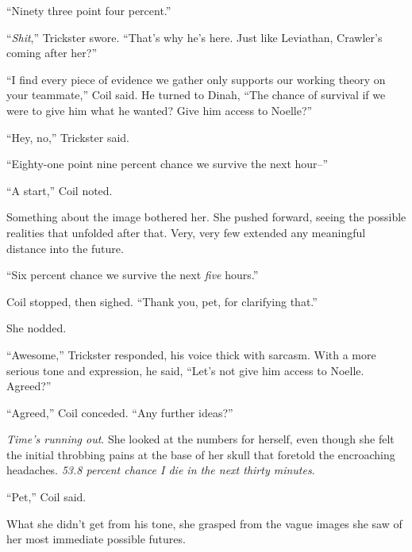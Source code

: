 ``Ninety three point four percent.''



``\emph{Shit},'' Trickster swore.  ``That's why he's here.  Just like Leviathan, Crawler's coming after her?''



``I find every piece of evidence we gather only supports our working theory on your teammate,'' Coil said.  He turned to Dinah, ``The chance of survival if we were to give him what he wanted?  Give him access to Noelle?''



``Hey, no,'' Trickster said.



``Eighty-one point nine percent chance we survive the next hour--''



``A start,'' Coil noted.



Something about the image bothered her.  She pushed forward, seeing the possible realities that unfolded after that.  Very, very few extended any meaningful distance into the future.



``Six percent chance we survive the next \emph{five} hours.''



Coil stopped, then sighed.  ``Thank you, pet, for clarifying that.''



She nodded.



``Awesome,'' Trickster responded, his voice thick with sarcasm.  With a more serious tone and expression, he said, ``Let's not give him access to Noelle.  Agreed?''



``Agreed,'' Coil conceded.  ``Any further ideas?''



\emph{Time's running out}.  She looked at the numbers for herself, even though she felt the initial throbbing pains at the base of her skull that foretold the encroaching headaches.  \emph{53.8 percent chance I die in the next thirty minutes}.



``Pet,'' Coil said.



What she didn't get from his tone, she grasped from the vague images she saw of her most immediate possible futures.




